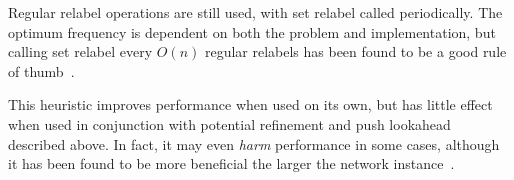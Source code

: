 Regular relabel operations are still used, with set relabel called periodically. The optimum frequency is dependent on both the problem and implementation, but calling set relabel every $O(n)$ regular relabels has been found to be a good rule of thumb~\cite{Goldberg:1997}.

This heuristic improves performance when used on its own, but has little effect when used in conjunction with potential refinement and push lookahead described above. In fact, it may even \emph{harm} performance in some cases, although it has been found to be more beneficial the larger the network instance~\cite{Bunnagel:1998}.